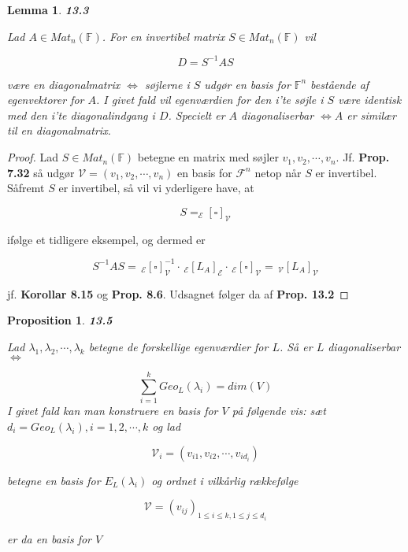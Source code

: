 \documentclass[paper=a4, fontsize=11pt]{scrartcl} %
\newtheorem*{lemma}{Lemma}
\newtheorem*{proposition}{Proposition}
\newenvironment{cstmproposition}[1]{\begin{proposition} {\normalfont\textbf{#1}}}{\end{proposition}}
\newenvironment{cstmlemma}[1]{\begin{lemma} {\normalfont\textbf{#1}}}{\end{lemma}}
\begin{document}
	
	\begin{cstmlemma}{13.3}
		
		Lad $A \in Mat_n(\mathbb{F})$. For en invertibel matrix $S \in Mat_n(\mathbb{F})$ vil
		
		\[D = S^{-1} A S\]
		
		være en diagonalmatrix $\Leftrightarrow$ søjlerne i $S$ udgør en basis for $\mathbb{F}^n$ bestående af egenvektorer for $A$. I givet fald vil egenværdien for den i'te søjle i $S$ være identisk med den i'te diagonalindgang i $D$. Specielt er $A$ diagonaliserbar $\Leftrightarrow A$ er similær til en diagonalmatrix. 
		
	\end{cstmlemma}
	
	\begin{proof}
		
		Lad $S \in Mat_n(\mathbb{F})$ betegne en matrix med søjler $v_1,v_2,\cdots,v_n$. Jf. \textbf{Prop. 7.32} så udgør $\mathcal{V} = (v_1,v_2,\cdots,v_n)$ en basis for $\mathcal{F}^n$ netop når $S$ er invertibel. Såfremt $S$ er invertibel, så vil vi yderligere have, at 
		
		\[S = _{\mathcal{E}}[{\scriptstyle\square}]_{\mathcal{V}}\]
		
		ifølge et tidligere eksempel, og dermed er
		
		\[S^{-1}AS = \, _{\mathcal{E}}[{\scriptstyle\square}]_{\mathcal{V}}^{-1} \cdot \, _{\mathcal{E}}[L_A]_{\mathcal{E}} \cdot \, _{\mathcal{E}}[{\scriptstyle\square}]_{\mathcal{V}} = \, _{\mathcal{V}}[L_A]_{\mathcal{V}}\]
		
		jf. \textbf{Korollar 8.15} og \textbf{Prop. 8.6}. Udsagnet følger da af \textbf{Prop. 13.2}
		
	\end{proof}
	
	
	\begin{cstmproposition}{13.5}
		
		Lad $\lambda_1,\lambda_2,\cdots,\lambda_k$ betegne de forskellige egenværdier for $L$. Så er $L$ diagonaliserbar $\Leftrightarrow$
		
		\[\sum_{i=1}^k Geo_L(\lambda_i) = dim(V) \tag{13.2}\]
		I givet fald kan man konstruere en basis for $V$ på følgende vis: sæt $d_i = Geo_L(\lambda_i), i = 1,2,\cdots,k$ og lad 
		
		\[\mathcal{V}_i = (v_{i1},v_{i2},\cdots,v_{id_i})\]
		
		betegne en basis for $E_L(\lambda_i)$ og ordnet i vilkårlig rækkefølge
		
		\[\mathcal{V} = (v_{ij})_{1 \leq i \leq k, 1 \leq j \leq d_i}\]
		
		er da en basis for $V$
		
		
	\end{cstmproposition}
	
\end{document}
